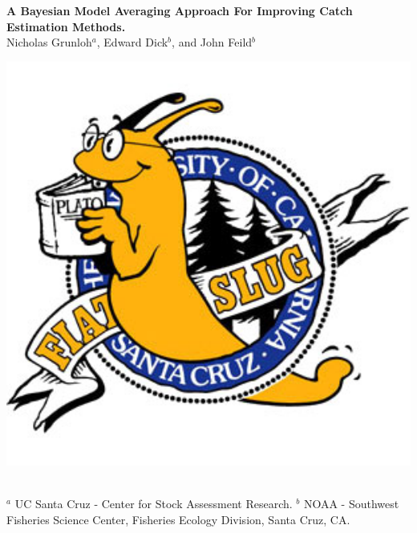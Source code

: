 \documentclass[a0paper,portrait]{baposter}
\begin{document}
\begin{poster}
{\begin{minipage}{0.14\textwidth}
\end{minipage}
\begin{minipage}{0.7\textwidth}
	\begin{center}
	{\huge \textbf{A Bayesian Model Averaging Approach For Improving Catch Estimation Methods.}}\\ %
	\vspace{0.5cm}
	{\Large Nicholas Grunloh$^a$, Edward Dick$^b$, and John Feild$^b$}
	\end{center}
\end{minipage}
\begin{minipage}{0.14\textwidth}
	\hspace*{-0.5cm}
	\includegraphics[width=1.2\textwidth]{../pictures/fiatSlug.jpg}
\end{minipage}
\normalsize
\\ \sf
$^a$ UC Santa Cruz - Center for Stock Assessment Research. $^b$ NOAA - Southwest Fisheries Science Center, Fisheries Ecology Division, Santa Cruz, CA.\\
}
\\


\end{poster}
\end{document}
